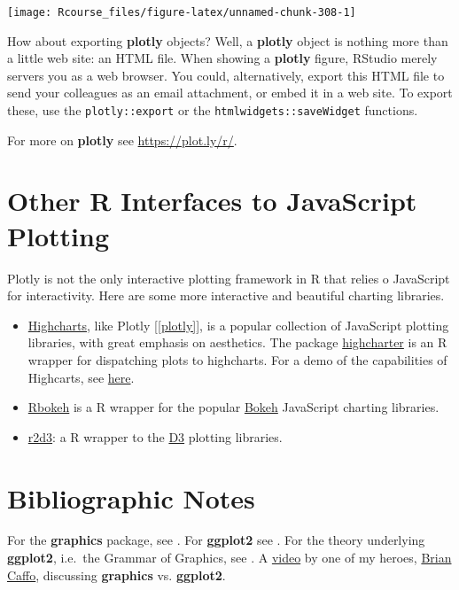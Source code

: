 \documentclass[]{book}
\theoremstyle{definition}
\theoremstyle{definition}
\theoremstyle{definition}
\theoremstyle{remark}
\begin{document}
\texttt{[image: Rcourse\_files/figure-latex/unnamed-chunk-308-1]}

How about exporting \textbf{plotly} objects? Well, a \textbf{plotly}
object is nothing more than a little web site: an HTML file. When
showing a \textbf{plotly} figure, RStudio merely servers you as a web
browser. You could, alternatively, export this HTML file to send your
colleagues as an email attachment, or embed it in a web site. To export
these, use the \texttt{plotly::export} or the
\texttt{htmlwidgets::saveWidget} functions.

For more on \textbf{plotly} see \url{https://plot.ly/r/}.

\section{Other R Interfaces to JavaScript
Plotting}\label{other-r-interfaces-to-javascript-plotting}

Plotly is not the only interactive plotting framework in R that relies o
JavaScript for interactivity. Here are some more interactive and
beautiful charting libraries.

\begin{itemize}
\item
  \href{https://www.highcharts.com/}{Highcharts}, like Plotly
  {[}\ref{plotly}{]}, is a popular collection of JavaScript plotting
  libraries, with great emphasis on aesthetics. The package
  \href{https://cran.r-project.org/package=highcharter}{highcharter} is
  an R wrapper for dispatching plots to highcharts. For a demo of the
  capabilities of Highcarts, see
  \href{https://www.highcharts.com/demo}{here}.
\item
  \href{http://hafen.github.io/rbokeh/}{Rbokeh} is a R wrapper for the
  popular \href{https://bokeh.pydata.org/en/latest/}{Bokeh} JavaScript
  charting libraries.
\item
  \href{https://rstudio.github.io/r2d3/}{r2d3}: a R wrapper to the
  \href{https://d3js.org/}{D3} plotting libraries.
\end{itemize}

\section{Bibliographic Notes}\label{bibliographic-notes-9}

For the \textbf{graphics} package, see \citet{Rlanguage}. For
\textbf{ggplot2} see \citet{ggplot2}. For the theory underlying
\textbf{ggplot2}, i.e.~the Grammar of Graphics, see
\citet{wilkinson2006grammar}. A
\href{https://www.youtube.com/watch?v=9Objw9Tvhb4\&feature=youtu.be}{video}
by one of my heroes, \href{http://www.bcaffo.com/}{Brian Caffo},
discussing \textbf{graphics} vs. \textbf{ggplot2}.
\end{document}
